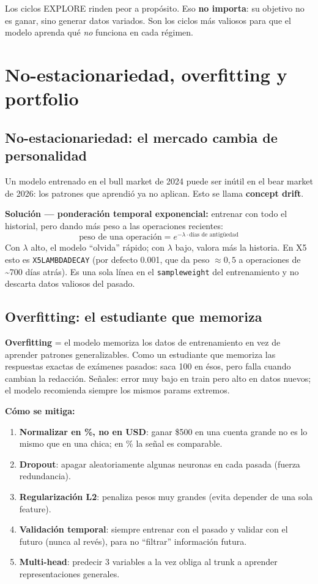 \documentclass[11pt,a4paper]{report}
\newcommand{\code}[1]{\texttt{\def\_{\textunderscore\allowbreak}#1}}
\begin{document}
Los ciclos EXPLORE rinden peor a propósito. Eso \textbf{no importa}: su objetivo no es ganar,
sino generar datos variados. Son los ciclos más valiosos para que el modelo aprenda qué
\emph{no} funciona en cada régimen.

\chapter{No-estacionariedad, overfitting y portfolio}

\section{No-estacionariedad: el mercado cambia de personalidad}

Un modelo entrenado en el bull market de 2024 puede ser inútil en el bear market de 2026: los
patrones que aprendió ya no aplican. Esto se llama \textbf{concept drift}.

\textbf{Solución — ponderación temporal exponencial:} entrenar con todo el historial, pero dando
más peso a las operaciones recientes:
\[
\text{peso de una operación} = e^{-\lambda \cdot \text{días de antigüedad}}
\]
Con $\lambda$ alto, el modelo ``olvida'' rápido; con $\lambda$ bajo, valora más la historia. En
X5 esto es \code{X5\_LAMBDA\_DECAY} (por defecto 0.001, que da peso $\approx 0{,}5$ a operaciones
de \textasciitilde700 días atrás). Es una sola línea en el \code{sample\_weight} del entrenamiento
y no descarta datos valiosos del pasado.

\section{Overfitting: el estudiante que memoriza}

\textbf{Overfitting} = el modelo memoriza los datos de entrenamiento en vez de aprender patrones
generalizables. Como un estudiante que memoriza las respuestas exactas de exámenes pasados: saca
100 en ésos, pero falla cuando cambian la redacción. Señales: error muy bajo en train pero alto
en datos nuevos; el modelo recomienda siempre los mismos params extremos.

\textbf{Cómo se mitiga:}
\begin{enumerate}[leftmargin=1.5em, itemsep=1pt]
  \item \textbf{Normalizar en \%, no en USD}: ganar \$500 en una cuenta grande no es lo mismo que
  en una chica; en \% la señal es comparable.
  \item \textbf{Dropout}: apagar aleatoriamente algunas neuronas en cada pasada (fuerza redundancia).
  \item \textbf{Regularización L2}: penaliza pesos muy grandes (evita depender de una sola feature).
  \item \textbf{Validación temporal}: siempre entrenar con el pasado y validar con el futuro
  (nunca al revés), para no ``filtrar'' información futura.
  \item \textbf{Multi-head}: predecir 3 variables a la vez obliga al trunk a aprender
  representaciones generales.
\end{enumerate}
\end{document}
